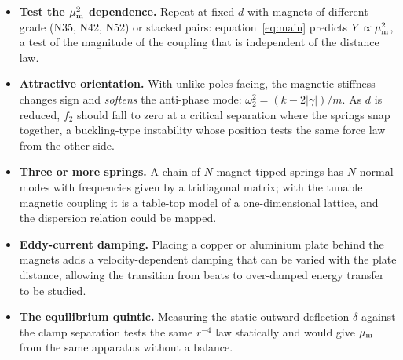 \begin{itemize}
\item \textbf{Test the $\mu_{\mathrm m}^2$ dependence.} Repeat at fixed $d$ with magnets of different grade (N35, N42, N52) or stacked pairs: equation~\eqref{eq:main} predicts $Y\propto\mu_{\mathrm m}^2$, a test of the magnitude of the coupling that is independent of the distance law.
\item \textbf{Attractive orientation.} With unlike poles facing, the magnetic stiffness changes sign and \emph{softens} the anti-phase mode: $\omega_2^2=(k-2|\gamma|)/m$. As $d$ is reduced, $f_2$ should fall to zero at a critical separation where the springs snap together, a buckling-type instability whose position tests the same force law from the other side.
\item \textbf{Three or more springs.} A chain of $N$ magnet-tipped springs has $N$ normal modes with frequencies given by a tridiagonal matrix; with the tunable magnetic coupling it is a table-top model of a one-dimensional lattice, and the dispersion relation could be mapped.
\item \textbf{Eddy-current damping.} Placing a copper or aluminium plate behind the magnets adds a velocity-dependent damping that can be varied with the plate distance, allowing the transition from beats to over-damped energy transfer to be studied.
\item \textbf{The equilibrium quintic.} Measuring the static outward deflection $\delta$ against the clamp separation tests the same $r^{-4}$ law statically and would give $\mu_{\mathrm m}$ from the same apparatus without a balance.
\end{itemize}
